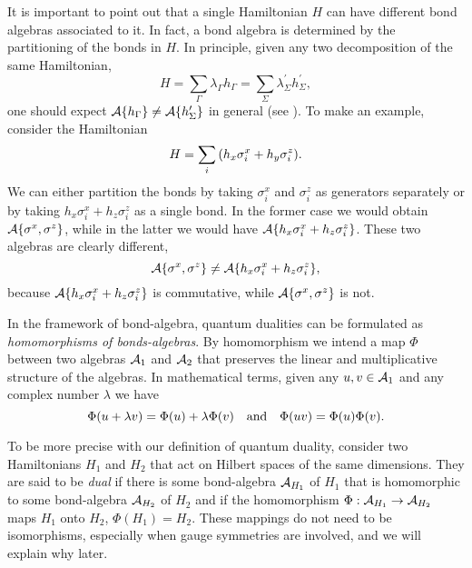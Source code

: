 It is important to point out that a single Hamiltonian $H$ can have different bond algebras associated to it.
In fact, a bond algebra is determined by the partitioning of the bonds in $H$.
In principle, given any two decomposition of the same Hamiltonian,
\begin{equation*}
    H
    = \sum_{\Gamma} \lambda_{\Gamma} h_{\Gamma}
    = \sum_{\Sigma} \lambda^\prime_{\Sigma} h^\prime_{\Sigma},
\end{equation*}
one should expect $\mathcal{A}\{h_{\Gamma}\} \neq \mathcal{A}\{ h^{\prime}_{\Sigma} \}$ in general (see \cite{cobanera2011bond}).
To make an example, consider the Hamiltonian
\begin{equation*}
    H = \sum_{i} \qty( h_x \sigma^x_i + h_y \sigma^z_i ).
\end{equation*}
We can either partition the bonds by taking $\sigma^x_i$ and $\sigma^z_i$ as generators separately or by taking $h_x \sigma^x_i + h_z \sigma^z_i$ as a single bond.
In the former case we would obtain $\mathcal{A}\{\sigma^x, \sigma^z\} $, while in the latter we would have $\mathcal{A}\{h_x \sigma^x_i + h_z \sigma^z_i\}$.
These two algebras are clearly different,
\begin{equation*}
    \mathcal{A}\{\sigma^x, \sigma^z\}
    \neq
    \mathcal{A}\{h_x \sigma^x_i + h_z \sigma^z_i\},
\end{equation*}
because $\mathcal{A}\{h_x \sigma^x_i + h_z \sigma^z_i\}$ is commutative, while $\mathcal{A}\{\sigma^x, \sigma^z\} $ is not.

In the framework of bond-algebra, quantum dualities can be formulated as \emph{homomorphisms of bonds-algebras}.
By homomorphism we intend a map $\Phi$ between two algebras $\mathcal{A}_1$ and $\mathcal{A}_2$ that preserves the linear and multiplicative structure of the algebras.
In mathematical terms, given any $u,v \in \mathcal{A}_1$ and any complex number $\lambda$ we have
\begin{equation*}
    \Phi(u + \lambda v) = \Phi(u) + \lambda \Phi(v)
    \qand
    \Phi(u v) = \Phi(u) \Phi(v).
\end{equation*}

To be more precise with our definition of quantum duality,
consider two Hamiltonians $H_1$ and $H_2$ that act on Hilbert spaces of the same dimensions.
They are said to be \emph{dual} if there is some bond-algebra $\mathcal{A}_{H_1}$ of $H_1$ that is homomorphic to some bond-algebra $\mathcal{A}_{H_2}$ of $H_2$ and if the homomorphism $\Phi : \mathcal{A}_{H_1} \to \mathcal{A}_{H_2}$ maps $H_1$ onto $H_2$, $\Phi(H_1) = H_2$.
These mappings do not need to be isomorphisms, especially when gauge symmetries are involved, and we will explain why later.

